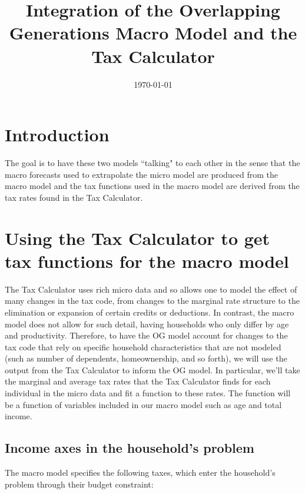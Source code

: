 \documentclass[letterpaper,12pt]{article}
\theoremstyle{definition}
\begin{document}
\title{Integration of the Overlapping Generations Macro Model and the Tax Calculator}
\date{\today}
\author{}
\maketitle

\begin{spacing}{1.5}


\section*{Introduction}
The goal is to have these two models ``talking" to each other in the sense that the macro forecasts used to extrapolate the micro model are produced from the macro model and the tax functions used in the macro model are derived from the tax rates found in the Tax Calculator.

\section{Using the Tax Calculator to get tax functions for the macro model}
The Tax Calculator uses rich micro data and so allows one to model the effect of many changes in the tax code, from changes to the marginal rate structure to the elimination or expansion of certain credits or deductions.  In contrast, the macro model does not allow for such detail, having households who only differ by age and productivity.  Therefore, to have the OG model account for changes to the tax code that rely on specific household characteristics that are not modeled (such as number of dependents, homeownership, and so forth), we will use the output from the Tax Calculator to inform the OG model.  In particular, we'll take the marginal and average tax rates that the Tax Calculator finds for each individual in the micro data and fit a function to these rates.  The function will be a function of variables included in our macro model such as age and total income.


\subsection{Income axes in the household's problem}
The macro model specifies the following taxes, which enter the household's problem through their budget constraint:


\end{spacing}
\end{document}
